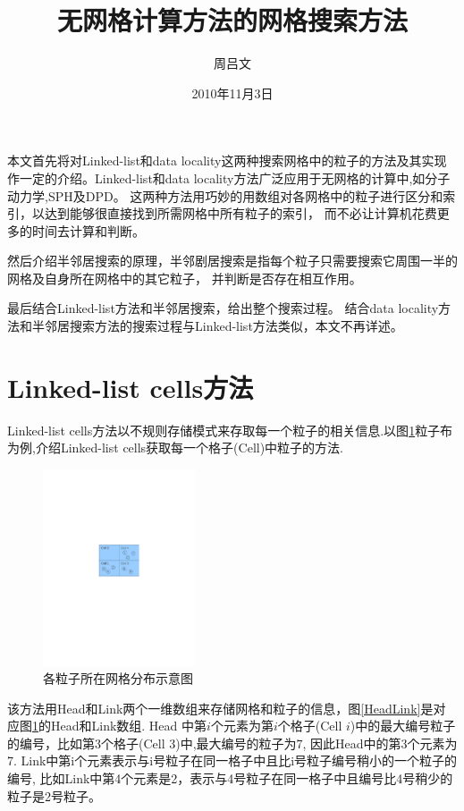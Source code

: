 \documentclass[a4paper]{article}
\begin{document}
\title{无网格计算方法的网格搜索方法}
\author{周吕文}
\date{2010年11月3日}
\maketitle

本文首先将对Linked-list和data locality这两种搜索网格中的粒子的方法及其实现作一定的介绍。Linked-list和data locality方法广泛应用于无网格的计算中,如分子动力学,SPH及DPD。
这两种方法用巧妙的用数组对各网格中的粒子进行区分和索引，以达到能够很直接找到所需网格中所有粒子的索引，
而不必让计算机花费更多的时间去计算和判断。

然后介绍半邻居搜索的原理，半邻剧居搜索是指每个粒子只需要搜索它周围一半的网格及自身所在网格中的其它粒子，
并判断是否存在相互作用。

最后结合Linked-list方法和半邻居搜索，给出整个搜索过程。
结合data locality方法和半邻居搜索方法的搜索过程与Linked-list方法类似，本文不再详述。

\section{Linked-list cells方法}

Linked-list cells方法以不规则存储模式来存取每一个粒子的相关信息.以图\ref{ParticleDistribute}粒子布为例,介绍Linked-list cells获取每一个格子(Cell)中粒子的方法.

\begin{figure}[!htb]
\centering
\includegraphics[width=0.4\textwidth]{fig01.pdf}
\caption{\label{ParticleDistribute}各粒子所在网格分布示意图}
\end{figure}


该方法用Head和Link两个一维数组来存储网格和粒子的信息，图\ref{HeadLink}是对应图\ref{ParticleDistribute}的Head和Link数组. Head 中第$i$个元素为第$i$个格子(Cell $i$)中的最大编号粒子的编号，比如第3个格子(Cell 3)中,最大编号的粒子为7, 因此Head中的第3个元素为7. Link中第i个元素表示与i号粒子在同一格子中且比i号粒子编号稍小的一个粒子的编号, 比如Link中第4个元素是2，表示与4号粒子在同一格子中且编号比4号稍少的粒子是2号粒子。
\end{document}
